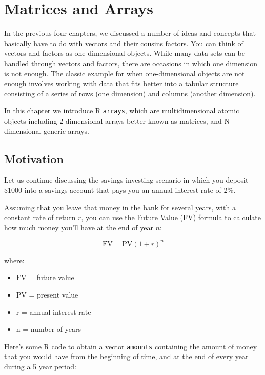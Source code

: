 \documentclass[
]{book}
\providecommand{\tightlist}{%
  \setlength{\itemsep}{0pt}\setlength{\parskip}{0pt}}
\begin{document}
\hypertarget{matrices1}{%
\chapter{Matrices and Arrays}\label{matrices1}}

In the previous four chapters, we discussed a number of ideas and concepts that
basically have to do with vectors and their cousins factors. You can think of
vectors and factors as one-dimensional objects. While many data sets can be
handled through vectors and factors, there are occasions in which one dimension
is not enough. The classic example for when one-dimensional objects are not
enough involves working with data that fits better into a tabular structure
consisting of a series of rows (one dimension) and columns (another dimension).

In this chapter we introduce R \texttt{arrays}, which are multidimensional atomic
objects including 2-dimensional arrays better known as matrices, and
N-dimensional generic arrays.

\hypertarget{motivation-1}{%
\section{Motivation}\label{motivation-1}}

Let us continue discussing the savings-investing scenario in which you deposit
\$1000 into a savings account that pays you an annual interest rate of 2\%.

Assuming that you leave that money in the bank for several years, with a
constant rate of return \(r\), you can use the Future Value (FV) formula to
calculate how much money you'll have at the end of year \(n\):

\[
\text{FV} = \text{PV} (1 + r)^n
\]

where:

\begin{itemize}
\tightlist
\item
  \(\text{FV}\) = future value
\item
  \(\text{PV}\) = present value
\item
  \(\text{r}\) = annual interest rate
\item
  \(\text{n}\) = number of years
\end{itemize}

Here's some R code to obtain a vector \texttt{amounts} containing the amount of money
that you would have from the beginning of time, and at the end of every year
during a 5 year period:
\end{document}
